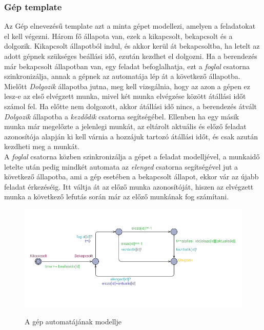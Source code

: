 \documentclass {report}
\begin{document}
    \subsubsection*{Gép template}
    Az Gép elnevezésű template azt a minta gépet modellezi, amelyen a feladatokat el kell végezni. Három fő állapota van, ezek a kikapcsolt, bekapcsolt és a dolgozik. Kikapcsolt állapotból indul, és akkor kerül át bekapcsoltba, ha letelt az adott gépnek szükséges beállási idő, ezután kezdhet el dolgozni.  Ha a berendezés már bekapcsolt állapotban van, egy feladat befoglalhatja, ezt a \emph{foglal} csatorna szinkronizálja, annak a gépnek az automatája lép át a következő állapotba. Mielőtt \emph{Dolgozik} állapotba jutna, meg kell vizsgálnia, hogy az azon a gépen ez lesz-e az első elvégzett munka, mivel két munka elvégzése között átállási időt számol fel. Ha előtte nem dolgozott, akkor átállási idő nincs, a berendezés átvált \emph{Dolgozik} állapotba a \emph{kezdődik} csatorna segítségébel. Ellenben ha egy másik munka már megelőzte a jelenlegi munkát, az eltárolt aktuális és előző feladat azonosítója alapján ki kell várnia a hozzájuk tartozó átállási időt, és csak azután kezdheti meg a munkát. \\
    A \emph{foglal} csatorna közben szinkronizálja a gépet a feladat modelljével, a munkaidő letelte után pedig mindkét automata az \emph{elenged} csatorna segítségével jut a következő állapotba, ami a gép esetében a bekapcsolt állapot, ekkor vár az újabb feladat érkezéséig. Itt váltja át az előző munka azonosítóját, hiszen az elvégzett munka a következő lefutás során már az előző munkának fog számítani. 
    \begin{figure}[htpb]
    \begin{center}
   \includegraphics[width=12cm]{gep}\\
    \caption{A gép automatájának modellje}
    \end{center}
    \end{figure}\\
\end{document}
